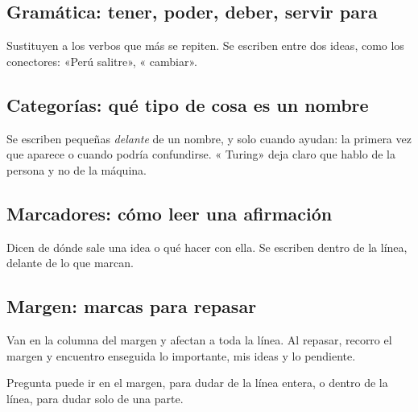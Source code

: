 \subsection{Gramática: tener, poder, deber, servir para}
Sustituyen a los verbos que más se repiten. Se escriben entre dos ideas, como
los conectores: «Perú  salitre», «  cambiar».\par\vspace{2mm}

\subsection{Categorías: qué tipo de cosa es un nombre}
Se escriben pequeñas \emph{delante} de un nombre, y solo cuando ayudan: la
primera vez que aparece o cuando podría confundirse. « Turing» deja
claro que hablo de la persona y no de la máquina.\par\vspace{2mm}

\subsection{Marcadores: cómo leer una afirmación}
Dicen de dónde sale una idea o qué hacer con ella. Se escriben dentro de la
línea, delante de lo que marcan.\par\vspace{2mm}

\subsection{Margen: marcas para repasar}
Van en la columna del margen y afectan a toda la línea. Al repasar, recorro el
margen y encuentro enseguida lo importante, mis ideas y lo pendiente.\par\vspace{2mm}
\noindent{}\hfill\KalaTarjetaVacia\hfill\KalaTarjetaVacia\hfill\KalaTarjetaVacia\par\vspace{3mm}

{\small\color{KalaSuave}Pregunta  puede ir en el margen, para dudar de
la línea entera, o dentro de la línea, para dudar solo de una parte.}

\clearpage
